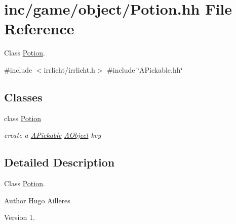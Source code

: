 \hypertarget{Potion_8hh}{}\section{inc/game/object/\+Potion.hh File Reference}
\label{Potion_8hh}


Class \hyperlink{classPotion}{Potion}.  


{\ttfamily \#include $<$irrlicht/irrlicht.\+h$>$}\newline
{\ttfamily \#include \char`\"{}A\+Pickable.\+hh\char`\"{}}\newline
\subsection*{Classes}
\begin{DoxyCompactItemize}
\item 
class \hyperlink{classPotion}{Potion}
\begin{DoxyCompactList}\small\item\em create a \hyperlink{classAPickable}{A\+Pickable} \hyperlink{classAObject}{A\+Object} key \end{DoxyCompactList}\end{DoxyCompactItemize}


\subsection{Detailed Description}
Class \hyperlink{classPotion}{Potion}. 

\begin{DoxyAuthor}{Author}
Hugo Ailleres 
\end{DoxyAuthor}
\begin{DoxyVersion}{Version}
1. 
\end{DoxyVersion}
